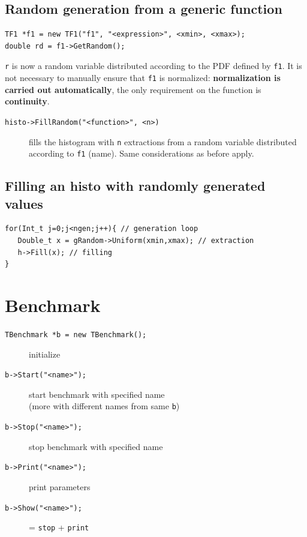 \documentclass[10pt, twoside]{article}
\newcommand{\ttt}[1]{\colorbox{boxgray}{\texttt{#1}}}
\begin{document}
\subsection{Random generation from a generic function}
\begin{verbatim}
TF1 *f1 = new TF1("f1", "<expression>", <xmin>, <xmax>);
double rd = f1->GetRandom();
\end{verbatim}
\ttt{r} is now a random variable distributed according to the PDF defined by \ttt{f1}. It is not necessary to manually ensure that \ttt{f1} is normalized: \textbf{normalization is carried out automatically}, the only requirement on the function is \textbf{continuity}.
\begin{description}
\item[\ttt{histo->FillRandom("<function>", <n>)}] fills the histogram with \ttt{n} extractions from a random variable distributed according to \ttt{f1} (name). Same considerations as before apply.
\end{description}
\subsection{Filling an histo with randomly generated values}
\begin{verbatim}
for(Int_t j=0;j<ngen;j++){ // generation loop
   Double_t x = gRandom->Uniform(xmin,xmax); // extraction
   h->Fill(x); // filling
}
\end{verbatim}

\section{Benchmark}

\begin{description}

\item[\ttt{TBenchmark *b = new TBenchmark();}] initialize

\item[\ttt{b->Start("<name>");}] start benchmark with specified name 
\\(more with different names from same \texttt{b})

\item[\ttt{b->Stop("<name>");}] stop benchmark with specified name

\item[\ttt{b->Print("<name>");}] print parameters

\item[\ttt{b->Show("<name>");}] = \texttt{stop} + \texttt{print}

\end{description}
\end{document}
